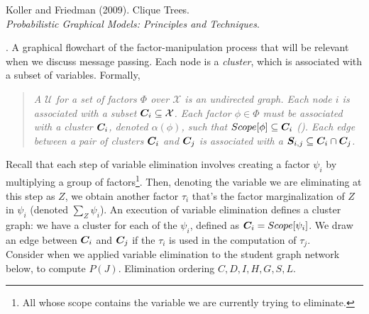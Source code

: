 \documentclass[11pt]{article}
\begin{document}
\clearpage
\vspace{-1.7em}
{\scriptsize Koller and Friedman (2009). Clique Trees.\\ \textit{Probabilistic Graphical Models: Principles and Techniques}.\\ }

\p {}. A graphical flowchart of the factor-manipulation process that will be relevant when we discuss message passing. Each node is a \textit{cluster}, which is associated with a subset of variables. Formally,
\vspace{-0.7em}
\begin{quote}
	{\itshape A  $\mathcal{U}$ for a set of factors $\Phi$ over $\mathcal X$ is an undirected graph. Each node $i$ is associated with a subset $\matr[i]{C} \subseteq \mathcal X$. Each factor $\phi \in \Phi$ must be associated with a cluster $\matr[i]{C}$, denoted $\alpha(\phi)$, such that $Scope[\phi] \subseteq \matr[i]{C}$ (). Each edge between a pair of clusters $\matr[i]{C}$ and $\matr[j]{C}$ is associated with a  $\matr[i,j]{S} \subseteq \matr[i]{C} \cap \matr[j]{C}$.  }
\end{quote}
Recall that each step of variable elimination involves creating a factor $\psi_i$ by multiplying a group of factors\footnote{All whose scope contains the variable we are currently trying to eliminate.}. Then, denoting the variable we are eliminating at this step as $Z$, we obtain another factor $\tau_i$ that's the factor marginalization of $Z$ in $\psi_i$ (denoted $\sum_Z \psi_i$). An execution of variable elimination defines a cluster graph: we have a cluster for each of the $\psi_i$, defined as $\matr[i]{C} = Scope[\psi_i]$. We draw an edge between $\matr[i]{C}$ and $\matr[j]{C}$ if the  $\tau_i$ is used in the computation of $\tau_j$. \\

Consider when we applied variable elimination to the student graph network below, to compute $P(J)$. Elimination ordering $C,D,I,H,G,S,L$.
\end{document}
